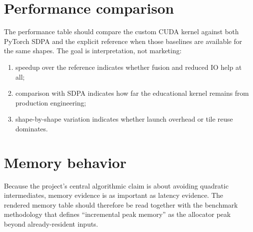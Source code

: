 
\section{Performance comparison}

The performance table should compare the custom CUDA kernel against both PyTorch SDPA and the explicit reference when those baselines are available for the same shapes. The goal is interpretation, not marketing:
\begin{enumerate}
  \item speedup over the reference indicates whether fusion and reduced IO help at all;
  \item comparison with SDPA indicates how far the educational kernel remains from production engineering;
  \item shape-by-shape variation indicates whether launch overhead or tile reuse dominates.
\end{enumerate}


\section{Memory behavior}

Because the project's central algorithmic claim is about avoiding quadratic intermediates, memory evidence is as important as latency evidence. The rendered memory table should therefore be read together with the benchmark methodology that defines ``incremental peak memory'' as the allocator peak beyond already-resident inputs.


